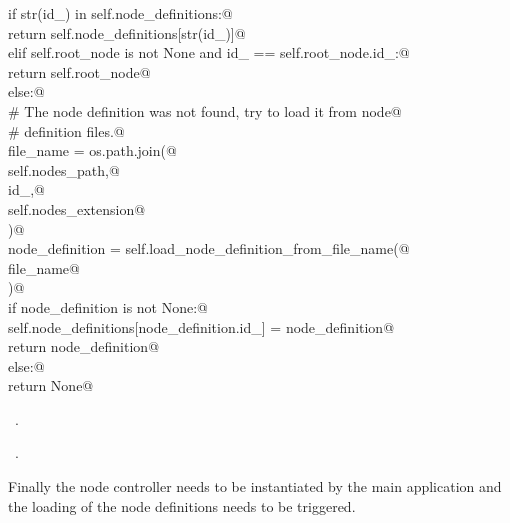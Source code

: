 \documentclass[
    a4paper,      %
    10pt,         %
    openright,    %
    notitlepage,  %
    parskip=half, %
]{scrreprt}       %
\theoremstyle{definition}                    %
\begin{document}
\begin{flushleft}
\begin{minipage}{\linewidth}
\begin{list}{}{}
\mbox{}\lstinline@    if str(id_) in self.node_definitions:@\\
\mbox{}\lstinline@        return self.node_definitions[str(id_)]@\\
\mbox{}\lstinline@    elif self.root_node is not None and id_ == self.root_node.id_:@\\
\mbox{}\lstinline@        return self.root_node@\\
\mbox{}\lstinline@    else:@\\
\mbox{}\lstinline@        # The node definition was not found, try to load it from node@\\
\mbox{}\lstinline@        # definition files.@\\
\mbox{}\lstinline@        file_name = os.path.join(@\\
\mbox{}\lstinline@            self.nodes_path,@\\
\mbox{}\lstinline@            id_,@\\
\mbox{}\lstinline@            self.nodes_extension@\\
\mbox{}\lstinline@        )@\\
\mbox{}\lstinline@        node_definition = self.load_node_definition_from_file_name(@\\
\mbox{}\lstinline@            file_name@\\
\mbox{}\lstinline@        )@\\
\mbox{}\lstinline@        if node_definition is not None:@\\
\mbox{}\lstinline@            self.node_definitions[node_definition.id_] = node_definition@\\
\mbox{}\lstinline@            return node_definition@\\
\mbox{}\lstinline@        else:@\\
\mbox{}\lstinline@            return None@{\NWsep}
\end{list}
\vspace{-1.5ex}
\footnotesize
\begin{list}{}{\setlength{\itemsep}{-\parsep}\setlength{\itemindent}{-\leftmargin}}
\item \NWtxtMacroDefBy\ .
\item \NWtxtMacroRefIn\ .

\item{}
\end{list}
\end{minipage}\vspace{4ex}
\end{flushleft}
Finally the node controller needs to be instantiated by the main application
and the loading of the node definitions needs to be triggered.
\end{document}
